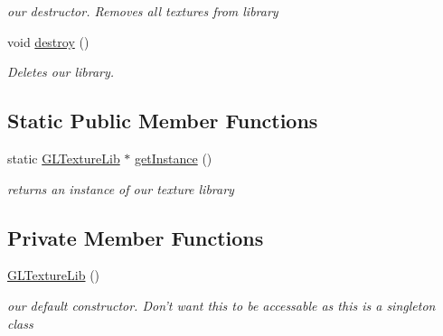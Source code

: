 \begin{DoxyCompactItemize}
\begin{DoxyCompactList}\small\item\em our destructor. Removes all textures from library \end{DoxyCompactList}\item 
\hypertarget{class_g_l_texture_lib_a49ba9410297b15f1f2988369853c108f}{void \hyperlink{class_g_l_texture_lib_a49ba9410297b15f1f2988369853c108f}{destroy} ()}\label{class_g_l_texture_lib_a49ba9410297b15f1f2988369853c108f}

\begin{DoxyCompactList}\small\item\em Deletes our library. \end{DoxyCompactList}\end{DoxyCompactItemize}
\subsection*{Static Public Member Functions}
\begin{DoxyCompactItemize}
\item 
\hypertarget{class_g_l_texture_lib_aedb1360fe37f369eb290f773dbada309}{static \hyperlink{class_g_l_texture_lib}{G\-L\-Texture\-Lib} $\ast$ \hyperlink{class_g_l_texture_lib_aedb1360fe37f369eb290f773dbada309}{get\-Instance} ()}\label{class_g_l_texture_lib_aedb1360fe37f369eb290f773dbada309}

\begin{DoxyCompactList}\small\item\em returns an instance of our texture library \end{DoxyCompactList}\end{DoxyCompactItemize}
\subsection*{Private Member Functions}
\begin{DoxyCompactItemize}
\item 
\hypertarget{class_g_l_texture_lib_a7ac1f52801de2e75472f3bd495c40185}{\hyperlink{class_g_l_texture_lib_a7ac1f52801de2e75472f3bd495c40185}{G\-L\-Texture\-Lib} ()}\label{class_g_l_texture_lib_a7ac1f52801de2e75472f3bd495c40185}

\begin{DoxyCompactList}\small\item\em our default constructor. Don't want this to be accessable as this is a singleton class \end{DoxyCompactList}\end{DoxyCompactItemize}
